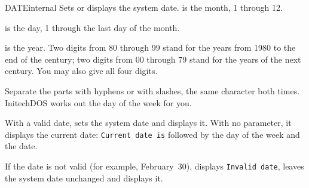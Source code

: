 \begin{DosEntry}{DATE}{}{internal}
\Purpose Sets or displays the system date.
\Format {}
\Remarks
{} is the month, 1 through 12.

 is the day, 1 through the last day of the month.

 is the year.  Two digits from 80 through 99 stand for the years
from 1980 to the end of the century; two digits from 00 through 79 stand for
the years of the next century.  You may also give all four digits.

Separate the parts with hyphens or with slashes, the same character both
times.  InitechDOS works out the day of the week for you.

With a valid date,  sets the system date and displays it.  With
no parameter, it displays the current date:
\texttt{Current date is} followed by the day of the week and the date.

If the date is not valid (for example, February~30),  displays
\texttt{Invalid date}, leaves the system date unchanged and displays it.

\Example
{}
\end{DosEntry}

